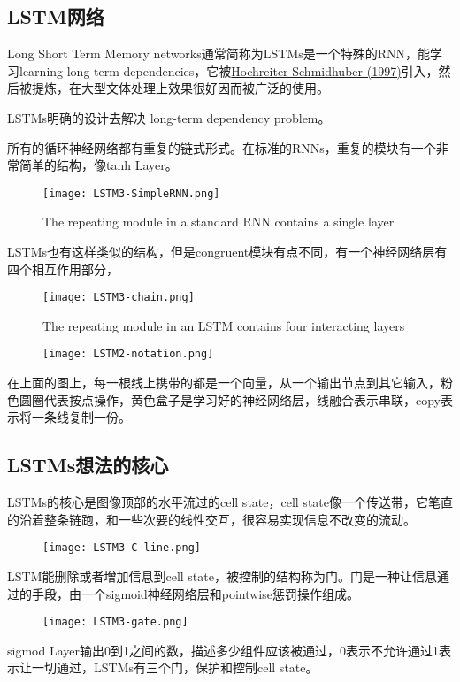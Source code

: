 \subsection{LSTM网络}
Long Short Term Memory networks通常简称为LSTMs是一个特殊的RNN，能学习learning long-term dependencies，它被\href{http://deeplearning.cs.cmu.edu/pdfs/Hochreiter97_lstm.pdf}{Hochreiter  Schmidhuber (1997)}引入，然后被提炼，在大型文体处理上效果很好因而被广泛的使用。\par
LSTMs明确的设计去解决 long-term dependency problem。\par
所有的循环神经网络都有重复的链式形式。在标准的RNNs，重复的模块有一个非常简单的结构，像tanh Layer。
\begin{figure}
\centering
\texttt{[image: LSTM3-SimpleRNN.png]}
\caption{The repeating module in a standard RNN contains a single layer}
\end{figure}
LSTMs也有这样类似的结构，但是congruent模块有点不同，有一个神经网络层有四个相互作用部分，
\begin{figure}
\centering
\texttt{[image: LSTM3-chain.png]}
\caption{The repeating module in an LSTM contains four interacting layers}
\end{figure}
\begin{figure}
\centering
\texttt{[image: LSTM2-notation.png]}
\end{figure}
在上面的图上，每一根线上携带的都是一个向量，从一个输出节点到其它输入，粉色圆圈代表按点操作，黄色盒子是学习好的神经网络层，线融合表示串联，copy表示将一条线复制一份。
\subsection{LSTMs想法的核心}
LSTMs的核心是图像顶部的水平流过的cell state，cell state像一个传送带，它笔直的沿着整条链跑，和一些次要的线性交互，很容易实现信息不改变的流动。
\begin{figure}
\centering
\texttt{[image: LSTM3-C-line.png]}
\end{figure}
LSTM能删除或者增加信息到cell state，被控制的结构称为门。门是一种让信息通过的手段，由一个sigmoid神经网络层和pointwise惩罚操作组成。
\begin{figure}
\centering
\texttt{[image: LSTM3-gate.png]}
\end{figure}
sigmod Layer输出0到1之间的数，描述多少组件应该被通过，0表示不允许通过1表示让一切通过，LSTMs有三个门，保护和控制cell state。
